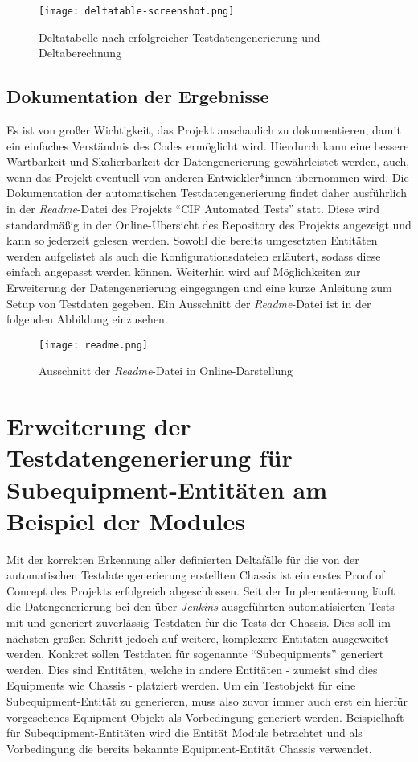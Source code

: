 \begin{figure}[h]
    \centering
    \texttt{[image: deltatable-screenshot.png]}
    \caption{Deltatabelle nach erfolgreicher Testdatengenerierung und Deltaberechnung}
\end{figure}

\subsection{Dokumentation der Ergebnisse}\label{subsec:documentationChassis}
Es ist von großer Wichtigkeit, das Projekt anschaulich zu dokumentieren, damit ein einfaches Verständnis des Codes ermöglicht wird. Hierdurch kann eine bessere Wartbarkeit und Skalierbarkeit der Datengenerierung gewährleistet werden, auch, wenn das Projekt eventuell von anderen Entwickler*innen übernommen wird. Die Dokumentation der automatischen Testdatengenerierung findet daher ausführlich in der \textit{Readme}-Datei des Projekts \enquote{CIF Automated Tests} statt. Diese wird standardmäßig in der Online-Übersicht des Repository des Projekts angezeigt und kann so jederzeit gelesen werden. Sowohl die bereits umgesetzten Entitäten werden aufgelistet als auch die Konfigurationsdateien erläutert, sodass diese einfach angepasst werden können. Weiterhin wird auf Möglichkeiten zur Erweiterung der Datengenerierung eingegangen und eine kurze Anleitung zum Setup von Testdaten gegeben. Ein Ausschnitt der \textit{Readme}-Datei ist in der folgenden Abbildung einzusehen.

\begin{figure}[h]
    \centering
    \texttt{[image: readme.png]}
    \caption[Ausschnitt der \textit{Readme}-Datei]{Ausschnitt der \textit{Readme}-Datei in Online-Darstellung\footnotemark}
\end{figure}

\section{Erweiterung der Testdatengenerierung für Subequipment-Entitäten am Beispiel der Modules}\label{sec:tdgmodule}
Mit der korrekten Erkennung aller definierten Deltafälle für die von der automatischen Testdatengenerierung erstellten Chassis ist ein erstes Proof of Concept des Projekts erfolgreich abgeschlossen. Seit der Implementierung läuft die Datengenerierung bei den über \textit{Jenkins} ausgeführten automatisierten Tests mit und generiert zuverlässig Testdaten für die Tests der Chassis. Dies soll im nächsten großen Schritt jedoch auf weitere, komplexere Entitäten ausgeweitet werden. Konkret sollen Testdaten für sogenannte \enquote{Subequipments} generiert werden. Dies sind Entitäten, welche in andere Entitäten - zumeist sind dies Equipments wie Chassis - platziert werden. Um ein Testobjekt für eine Subequipment-Entität zu generieren, muss also zuvor immer auch erst ein hierfür vorgesehenes Equipment-Objekt als Vorbedingung generiert werden. Beispielhaft für Subequipment-Entitäten wird die Entität Module betrachtet und als Vorbedingung die bereits bekannte Equipment-Entität Chassis verwendet.

